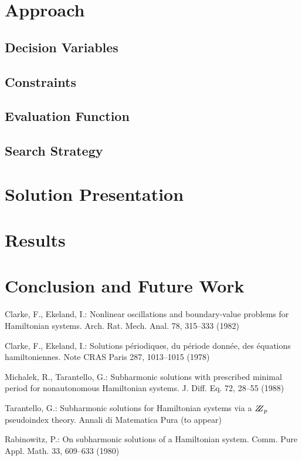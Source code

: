 \documentclass{llncs}
\begin{document}
%
\section{Approach}
%
\subsection{Decision Variables}
%
\subsection{Constraints}
%
\subsection{Evaluation Function}
%
\subsection{Search Strategy}
%
\section{Solution Presentation}
%
\section{Results}
%
\section{Conclusion and Future Work}
%


%
%
\begin{thebibliography}{5}
%
Clarke, F., Ekeland, I.:
Nonlinear oscillations and
boundary-value problems for Hamiltonian systems.
Arch. Rat. Mech. Anal. 78, 315--333 (1982)

Clarke, F., Ekeland, I.:
Solutions p\'{e}riodiques, du
p\'{e}riode donn\'{e}e, des \'{e}quations hamiltoniennes.
Note CRAS Paris 287, 1013--1015 (1978)

Michalek, R., Tarantello, G.:
Subharmonic solutions with prescribed minimal
period for nonautonomous Hamiltonian systems.
J. Diff. Eq. 72, 28--55 (1988)

Tarantello, G.:
Subharmonic solutions for Hamiltonian
systems via a $\bbbz_{p}$ pseudoindex theory.
Annali di Matematica Pura (to appear)

Rabinowitz, P.:
On subharmonic solutions of a Hamiltonian system.
Comm. Pure Appl. Math. 33, 609--633 (1980)

\end{thebibliography}
\end{document}
